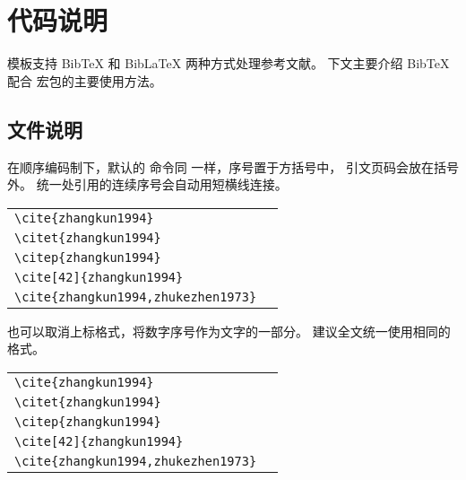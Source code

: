 
\chapter{代码说明}

模板支持 BibTeX 和 BibLaTeX 两种方式处理参考文献。
下文主要介绍 BibTeX 配合  宏包的主要使用方法。


\section{文件说明}

在顺序编码制下，默认的  命令同  一样，序号置于方括号中，
引文页码会放在括号外。
统一处引用的连续序号会自动用短横线连接。

\begin{tabular}{l@{\quad$\Rightarrow$\quad}l}
  \verb|\cite{zhangkun1994}|               & \cite{zhangkun1994}               \\
  \verb|\citet{zhangkun1994}|              & \citet{zhangkun1994}              \\
  \verb|\citep{zhangkun1994}|              & \citep{zhangkun1994}              \\
  \verb|\cite[42]{zhangkun1994}|           & \cite[42]{zhangkun1994}           \\
  \verb|\cite{zhangkun1994,zhukezhen1973}| & \cite{zhangkun1994,zhukezhen1973} \\
\end{tabular}


也可以取消上标格式，将数字序号作为文字的一部分。
建议全文统一使用相同的格式。

\begin{tabular}{l@{\quad$\Rightarrow$\quad}l}
  \verb|\cite{zhangkun1994}|               & \cite{zhangkun1994}               \\
  \verb|\citet{zhangkun1994}|              & \citet{zhangkun1994}              \\
  \verb|\citep{zhangkun1994}|              & \citep{zhangkun1994}              \\
  \verb|\cite[42]{zhangkun1994}|           & \cite[42]{zhangkun1994}           \\
  \verb|\cite{zhangkun1994,zhukezhen1973}| & \cite{zhangkun1994,zhukezhen1973} \\
\end{tabular}



